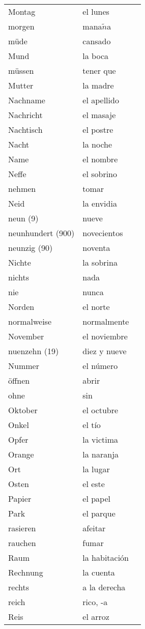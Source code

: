 \documentclass[10pt,spanish]{article}
\begin{document}
\begin{longtable}{p{} p{} | p{}}
Montag & el lunes  \\
morgen & mana$\tilde{n}$a \\
müde & cansado  \\
Mund & la boca  \\
müssen & tener que \\
Mutter & la madre  \\
Nachname & el apellido  \\
Nachricht & el masaje  \\
Nachtisch & el postre  \\
Nacht & la noche  \\
Name & el nombre  \\
Neffe & el sobrino  \\
nehmen & tomar  \\
Neid & la envidia \\
neun (9) & nueve  \\
neunhundert (900) & novecientos  \\
neunzig (90) & noventa  \\
Nichte & la sobrina  \\
nichts & nada \\
nie & nunca  \\
Norden & el norte  \\
normalweise & normalmente \\
November & el noviembre  \\
nuenzehn (19) & diez y nueve  \\
Nummer & el número  \\
öffnen & abrir  \\
ohne & sin  \\
Oktober & el octubre  \\
Onkel & el tío  \\
Opfer & la victima \\
Orange & la naranja  \\
Ort & la lugar  \\
Osten & el este  \\
Papier & el papel  \\
Park & el parque  \\
rasieren & afeitar \\
rauchen & fumar  \\
Raum & la habitación  \\
Rechnung & la cuenta  \\
rechts & a la derecha \\
reich & rico, -a  \\
Reis & el arroz  \\

\end{longtable}
\end{document}
